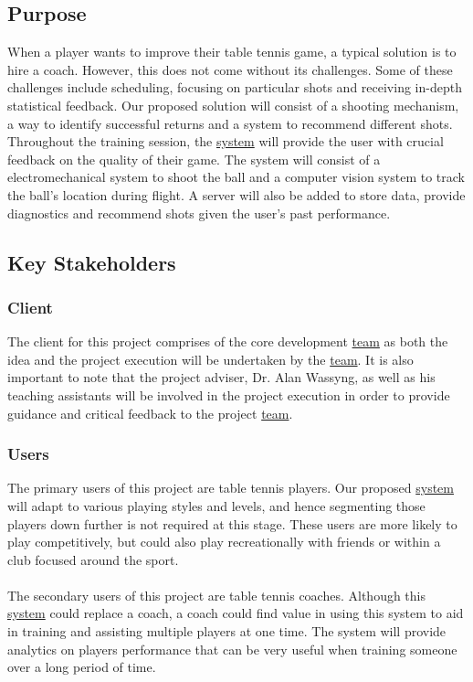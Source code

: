 \documentclass[11pt]{article}
\begin{document}
\subsection{Purpose}
When a player wants to improve their table tennis game, a typical solution is to hire a coach. However, this does not come without its challenges. Some of these challenges include scheduling, focusing on particular shots and receiving in-depth statistical feedback. Our proposed solution will consist of a shooting mechanism, a way to identify successful returns and a system to recommend different shots. Throughout the training session, the \hyperref[sec:definitions]{system} will provide the user with crucial feedback on the quality of their game. The system will consist of a electromechanical system to shoot the ball and a computer vision system to track the ball's location during flight. A server will also be added to store data, provide diagnostics and recommend shots given the user's past performance.
\subsection{Key Stakeholders}
\subsubsection{Client}
The client for this project comprises of the core development \hyperref[sec:definitions]{team} as both the idea and the project execution will be undertaken by the \hyperref[sec:definitions]{team}. It is also important to note that the project adviser, Dr. Alan Wassyng, as well as his teaching assistants will be involved in the project execution in order to provide guidance and critical feedback to the project \hyperref[sec:definitions]{team}.
\subsubsection{Users}
The primary users of this project are table tennis players. Our proposed \hyperref[sec:definitions]{system} will adapt to various playing styles and levels, and hence segmenting those players down further is not required at this stage. These users are more likely to play competitively, but could also play recreationally with friends or within a club focused around the sport. \\\\
The secondary users of this project are table tennis coaches. Although this \hyperref[sec:definitions]{system} could replace a coach, a coach could find value in using this system to aid in training and assisting multiple players at one time. The system will provide analytics on players performance that can be very useful when training someone over a long period of time.
\end{document}
